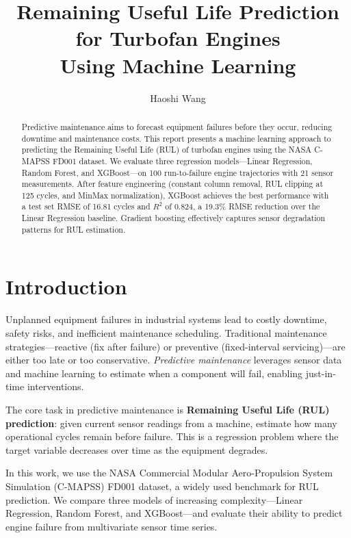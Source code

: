 \documentclass[11pt, a4paper]{article}
\title{Remaining Useful Life Prediction for Turbofan Engines\\Using Machine Learning}
\author{Haoshi Wang}
\date{}
\begin{document}
\maketitle

\begin{abstract}
Predictive maintenance aims to forecast equipment failures before they occur, reducing downtime and maintenance costs. This report presents a machine learning approach to predicting the Remaining Useful Life (RUL) of turbofan engines using the NASA C-MAPSS FD001 dataset. We evaluate three regression models---Linear Regression, Random Forest, and XGBoost---on 100 run-to-failure engine trajectories with 21 sensor measurements. After feature engineering (constant column removal, RUL clipping at 125 cycles, and MinMax normalization), XGBoost achieves the best performance with a test set RMSE of 16.81 cycles and $R^2$ of 0.824, a 19.3\% RMSE reduction over the Linear Regression baseline. Gradient boosting effectively captures sensor degradation patterns for RUL estimation.
\end{abstract}

\section{Introduction}

Unplanned equipment failures in industrial systems lead to costly downtime, safety risks, and inefficient maintenance scheduling. Traditional maintenance strategies---reactive (fix after failure) or preventive (fixed-interval servicing)---are either too late or too conservative. \textit{Predictive maintenance} leverages sensor data and machine learning to estimate when a component will fail, enabling just-in-time interventions.

The core task in predictive maintenance is \textbf{Remaining Useful Life (RUL) prediction}: given current sensor readings from a machine, estimate how many operational cycles remain before failure. This is a regression problem where the target variable decreases over time as the equipment degrades.

In this work, we use the NASA Commercial Modular Aero-Propulsion System Simulation (C-MAPSS) FD001 dataset, a widely used benchmark for RUL prediction. We compare three models of increasing complexity---Linear Regression, Random Forest, and XGBoost---and evaluate their ability to predict engine failure from multivariate sensor time series.
\end{document}
